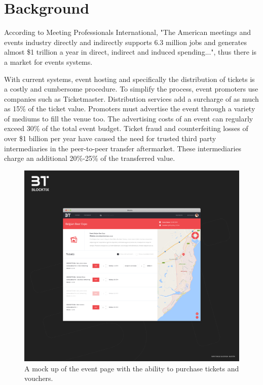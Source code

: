 \documentclass[a4paper]{article}
\begin{document}
\section{Background}
According to Meeting Professionals International, "The American meetings and events industry directly and indirectly supports 6.3 million jobs and generates almost \$1 trillion a year in direct, indirect and induced spending..."\cite{ksc2011EventsIndustry}\cite{pwc2012CICMeetings}, thus there is a market for events systems.\par
\vspace{5mm}
\noindent With current systems, event hosting and specifically the distribution of tickets is a costly and cumbersome procedure. To simplify the process, event promoters use companies such as Ticketmaster. Distribution services add a surcharge of as much as 15\% of the ticket value. Promoters must advertise the event through a variety of mediums to fill the venue too. The advertising costs of an event can regularly exceed 30\% of the total event budget. Ticket fraud \cite{internetfraud} and counterfeiting losses of over \$1 billion\cite{rc2013cfic} per year have caused the need for trusted third party intermediaries in the peer-to-peer transfer aftermarket. These intermediaries charge an additional 20\%-25\% of the transferred value.



\begin{figure}
\centering
\includegraphics[scale=0.20]{event_page.jpg}
\caption{\label{fig:event_page}A mock up of the event page with the ability to purchase tickets and vouchers.}
\end{figure}
\end{document}

